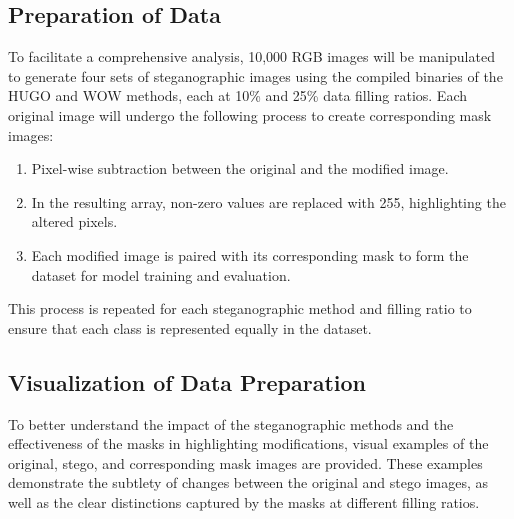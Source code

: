 \documentclass[12pt,a4paper]{article}
\begin{document}
\subsection{Preparation of Data}
To facilitate a comprehensive analysis, 10,000 RGB images will be manipulated to generate four sets of steganographic images using the compiled binaries of the HUGO and WOW methods, each at 10\% and 25\% data filling ratios. Each original image will undergo the following process to create corresponding mask images:
\begin{enumerate}
    \item Pixel-wise subtraction between the original and the modified image.
    \item In the resulting array, non-zero values are replaced with 255, highlighting the altered pixels.
    \item Each modified image is paired with its corresponding mask to form the dataset for model training and evaluation.
\end{enumerate}
This process is repeated for each steganographic method and filling ratio to ensure that each class is represented equally in the dataset.

\subsection{Visualization of Data Preparation}

To better understand the impact of the steganographic methods and the effectiveness of the masks in highlighting modifications, visual examples of the original, stego, and corresponding mask images are provided. These examples demonstrate the subtlety of changes between the original and stego images, as well as the clear distinctions captured by the masks at different filling ratios.

\setlength{\fboxsep}{0pt} %
\setlength{\fboxrule}{0.5pt} %
\end{document}

